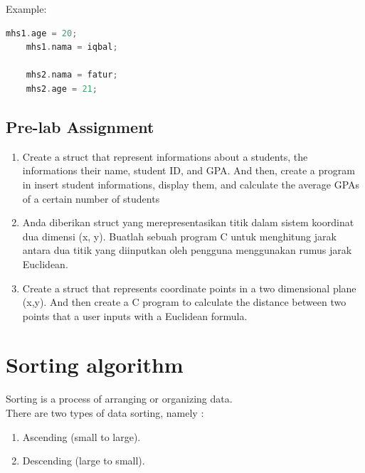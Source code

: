 Example:
\begin{lstlisting}[language=c]
    mhs1.age = 20;
    mhs1.nama = iqbal;
    
    mhs2.nama = fatur;
    mhs2.age = 21;
\end{lstlisting}

\subsection{Pre-lab Assignment}
\begin{enumerate}
    \item Create a struct that represent informations about a students, the informations their name, student ID, and GPA.
    And then, create a program in insert student informations, display them, and calculate the average GPAs of a
    certain number of students
    \item Anda diberikan struct yang merepresentasikan titik dalam sistem koordinat dua dimensi (x, y). 
    Buatlah sebuah program C untuk menghitung jarak antara dua titik yang diinputkan oleh pengguna menggunakan rumus jarak Euclidean.
    \item Create a struct that represents coordinate points in a two dimensional plane (x,y). And then create a C program to calculate
    the distance between two points that a user inputs with a Euclidean formula. 
\end{enumerate}

\section{Sorting algorithm}
Sorting is a process of arranging or organizing data.\\
There are two types of data sorting, namely :
\begin{enumerate}
    \item Ascending (small to large).
    \item Descending (large to small).
\end{enumerate}

